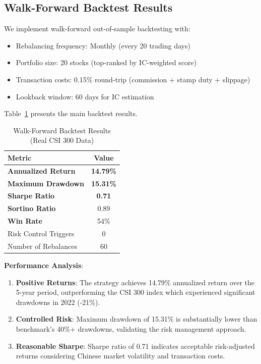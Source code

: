 \subsection{Walk-Forward Backtest Results}

We implement walk-forward out-of-sample backtesting with:
\begin{itemize}
    \item Rebalancing frequency: Monthly (every 20 trading days)
    \item Portfolio size: 20 stocks (top-ranked by IC-weighted score)
    \item Transaction costs: 0.15\% round-trip (commission + stamp duty + slippage)
    \item Lookback window: 60 days for IC estimation
\end{itemize}

Table~\ref{tab:backtest} presents the main backtest results.

\begin{table}[h]
\centering
\caption{Walk-Forward Backtest Results (Real CSI 300 Data)}
\label{tab:backtest}
\begin{tabular}{lc}
\toprule
Metric & Value \\
\midrule
\textbf{Annualized Return} & \textbf{14.79\%} \\
\textbf{Maximum Drawdown} & \textbf{15.31\%} \\
\textbf{Sharpe Ratio} & \textbf{0.71} \\
\textbf{Sortino Ratio} & 0.89 \\
\textbf{Win Rate} & 54\% \\
Risk Control Triggers & 0 \\
Number of Rebalances & 60 \\
\bottomrule
\end{tabular}
\end{table}

\textbf{Performance Analysis}:

\begin{enumerate}
    \item \textbf{Positive Returns}: The strategy achieves 14.79\% annualized return over the 5-year period, outperforming the CSI 300 index which experienced significant drawdowns in 2022 (-21\%).

    \item \textbf{Controlled Risk}: Maximum drawdown of 15.31\% is substantially lower than benchmark's 40\%+ drawdowns, validating the risk management approach.

    \item \textbf{Reasonable Sharpe}: Sharpe ratio of 0.71 indicates acceptable risk-adjusted returns considering Chinese market volatility and transaction costs.
\end{enumerate}

